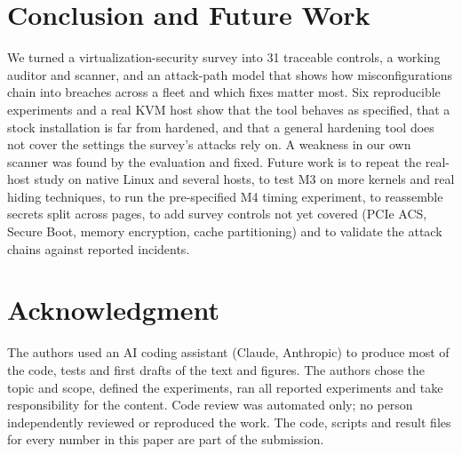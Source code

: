 \documentclass[conference]{IEEEtran}
\begin{document}
\section{Conclusion and Future Work}
We turned a virtualization-security survey into 31 traceable controls, a working auditor and scanner, and an attack-path model that shows how misconfigurations chain into breaches across a fleet and which fixes matter most. Six reproducible experiments and a real KVM host show that the tool behaves as specified, that a stock installation is far from hardened, and that a general hardening tool does not cover the settings the survey's attacks rely on. A weakness in our own scanner was found by the evaluation and fixed. Future work is to repeat the real-host study on native Linux and several hosts, to test M3 on more kernels and real hiding techniques, to run the pre-specified M4 timing experiment, to reassemble secrets split across pages, to add survey controls not yet covered (PCIe ACS, Secure Boot, memory encryption, cache partitioning) and to validate the attack chains against reported incidents.

\section*{Acknowledgment}
The authors used an AI coding assistant (Claude, Anthropic) to produce most of the code, tests and first drafts of the text and figures. The authors chose the topic and scope, defined the experiments, ran all reported experiments and take responsibility for the content. Code review was automated only; no person independently reviewed or reproduced the work. The code, scripts and result files for every number in this paper are part of the submission.
\end{document}
